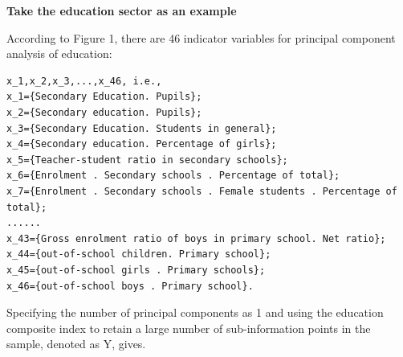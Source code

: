 \documentclass{apmcmthesis}
\begin{document}
\textbf{Take the education sector as an example}

According to Figure 1, there are 46 indicator variables for principal component analysis of education: 
\begin{lstlisting}
x_1,x_2,x_3,...,x_46, i.e., 
x_1={Secondary Education. Pupils}; 
x_2={Secondary education. Pupils}; 
x_3={Secondary Education. Students in general}; 
x_4={Secondary education. Percentage of girls}; 
x_5={Teacher-student ratio in secondary schools}; 
x_6={Enrolment . Secondary schools . Percentage of total}; 
x_7={Enrolment . Secondary schools . Female students . Percentage of total}; 
......
x_43={Gross enrolment ratio of boys in primary school. Net ratio}; 
x_44={out-of-school children. Primary school}; 
x_45={out-of-school girls . Primary schools}; 
x_46={out-of-school boys . Primary school}.
\end{lstlisting}

Specifying the number of principal components as 1 and using the education composite index to retain a large number of sub-information points in the sample, denoted as Y, gives.
\end{document}
